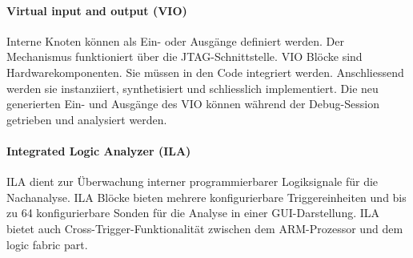 \paragraph{Virtual input and output (VIO)}$~$ \\
Interne Knoten können als Ein- oder Ausgänge definiert werden. Der Mechanismus funktioniert über die JTAG-Schnittstelle. VIO Blöcke sind Hardwarekomponenten. Sie müssen in den Code integriert werden. Anschliessend werden sie instanziiert, synthetisiert und schliesslich implementiert. Die neu generierten Ein- und Ausgänge des VIO können während der Debug-Session getrieben und analysiert werden.

\paragraph{Integrated Logic Analyzer (ILA)}$~$ \\
ILA dient zur Überwachung interner programmierbarer Logiksignale für die Nachanalyse. ILA Blöcke bieten mehrere konfigurierbare Triggereinheiten und bis zu 64 konfigurierbare Sonden für die Analyse in einer GUI-Darstellung. ILA bietet auch Cross-Trigger-Funktionalität zwischen dem ARM-Prozessor und dem logic fabric part.
